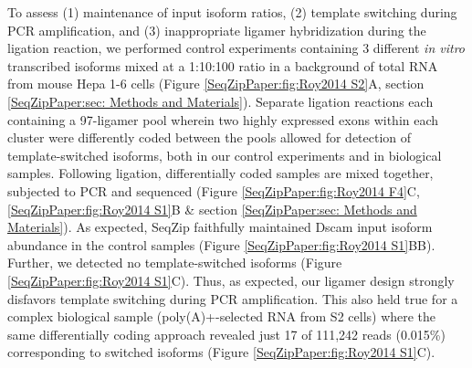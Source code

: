 		To assess (1) maintenance of input isoform ratios, (2) template switching during PCR amplification, and (3) inappropriate ligamer hybridization during the ligation reaction, we performed control experiments containing 3 different \textit{in vitro} transcribed \dscam{} isoforms mixed at a 1:10:100 ratio in a background of total RNA from mouse Hepa 1-6 cells (Figure \ref{SeqZipPaper:fig:Roy2014 S2}A, section \ref{SeqZipPaper:sec: Methods and Materials}). Separate ligation reactions each containing a 97-ligamer pool wherein two highly expressed exons within each cluster were differently coded between the pools allowed for detection of template-switched isoforms, both in our control experiments and in biological samples. Following ligation, differentially coded samples are mixed together, subjected to PCR and sequenced (Figure \ref{SeqZipPaper:fig:Roy2014 F4}C, \ref{SeqZipPaper:fig:Roy2014 S1}B \& section \ref{SeqZipPaper:sec: Methods and Materials}).  As expected, SeqZip faithfully maintained Dscam input isoform abundance in the control samples (Figure \ref{SeqZipPaper:fig:Roy2014 S1}BB). Further, we detected no template-switched isoforms (Figure \ref{SeqZipPaper:fig:Roy2014 S1}C). Thus, as expected, our ligamer design strongly disfavors template switching during PCR amplification. This also held true for a complex biological sample (poly(A)+-selected RNA from S2 cells) where the same differentially coding approach revealed just 17 of 111,242 reads (0.015\%) corresponding to switched isoforms (Figure \ref{SeqZipPaper:fig:Roy2014 S1}C).

